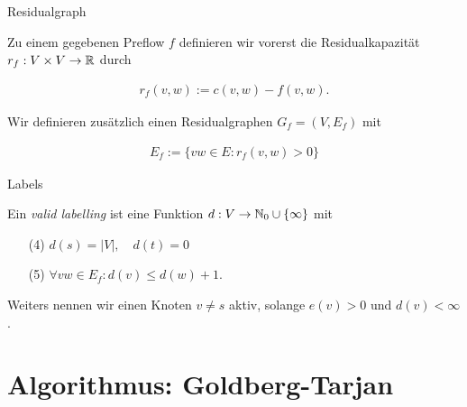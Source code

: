 \documentclass[aspectratio=169]{beamer}
\begin{document}
\begin{frame}{Residualgraph}

  \begin{definition}[Residualgraph]

    Zu einem gegebenen Preflow $f$ definieren wir vorerst die Residualkapazität
    $r_f: V \times V \to \mathbb{R}$ durch

    \begin{align*}
      r_f(v,w) := c(v,w) - f(v,w).
    \end{align*}

    Wir definieren zusätzlich einen Residualgraphen $G_f = (V,E_f)$ mit

    \begin{align*}
      E_f := \{ vw \in E: r_f(v,w) > 0\}
    \end{align*}
      
  \end{definition}
  

\end{frame}

\begin{frame}{Labels}

  \begin{definition}

    Ein \textit{valid labelling} ist eine Funktion $d: V \to \mathbb{N}_0 \cup \{\infty\}$ mit

    \begin{enumerate}
      \item[(4)] $d(s) = |V|, \quad d(t) = 0$
      \item[(5)] $\forall vw \in E_f: d(v) \leq d(w) + 1$.  
    \end{enumerate}

    Weiters nennen wir einen Knoten $v \neq s$ aktiv, solange $e(v) > 0$ und $d(v) < \infty$.
    
  \end{definition}

\end{frame}

\section{Algorithmus: Goldberg-Tarjan}
\end{document}

